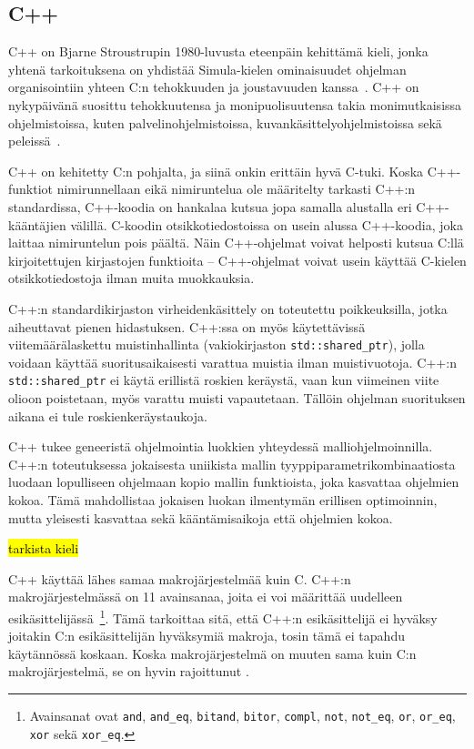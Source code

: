 \subsection{C++}

C++ on Bjarne Stroustrupin 1980-luvusta eteenpäin kehittämä kieli, jonka
yhtenä tarkoituksena on yhdistää Simula-kielen ominaisuudet ohjelman
organisointiin yhteen C:n tehokkuuden ja joustavuuden
kanssa~\citep{cpphistory}. C++ on nykypäivänä suosittu tehokkuutensa ja
monipuolisuutensa takia monimutkaisissa ohjelmistoissa, kuten
palvelinohjelmistoissa, kuvankäsittelyohjelmistoissa sekä
peleissä~\citep{cppapps}.

C++ on kehitetty C:n pohjalta, ja siinä onkin erittäin hyvä C-tuki. Koska
C++\hyp{}funktiot nimirunnellaan eikä nimiruntelua ole määritelty tarkasti C++:n
standardissa, C++-koodia on hankalaa kutsua jopa samalla alustalla eri
C++-kääntäjien välillä. C-koodin otsikkotiedostoissa on
usein alussa C++-koodia, joka laittaa nimiruntelun pois päältä. Näin
C++-ohjelmat voivat helposti kutsua C:llä kirjoitettujen kirjastojen funktioita
-- C++-ohjelmat voivat usein käyttää C-kielen otsikkotiedostoja ilman muita
muokkauksia.

C++:n standardikirjaston virheidenkäsittely on toteutettu poikkeuksilla, jotka
aiheuttavat pienen hidastuksen. C++:ssa on myös käytettävissä
viitemäärälaskettu muistinhallinta (vakiokirjaston
\texttt{std::shared\_ptr}), jolla voidaan käyttää suoritusaikaisesti varattua
muistia ilman muistivuotoja. C++:n \texttt{std::shared\_ptr} ei käytä erillistä
roskien keräystä, vaan kun viimeinen viite olioon poistetaan, myös varattu
muisti vapautetaan. Tällöin ohjelman suorituksen aikana ei tule
roskienkeräystaukoja.

C++ tukee geneeristä ohjelmointia luokkien
yhteydessä malliohjelmoinnilla. C++:n
toteutuksessa jokaisesta uniikista mallin tyyppiparametrikombinaatiosta luodaan
lopulliseen ohjelmaan kopio mallin funktioista, joka kasvattaa ohjelmien kokoa.
Tämä mahdollistaa jokaisen luokan ilmentymän erillisen
optimoinnin, mutta yleisesti kasvattaa sekä kääntämisaikoja että ohjelmien
kokoa.

\hl{tarkista kieli}

C++ käyttää lähes samaa makrojärjestelmää kuin C. C++:n makrojärjestelmässä on
11 avainsanaa, joita ei voi määrittää uudelleen
esikäsittelijässä~\citep[luku~19.2]{CPP17}\footnote{ Avainsanat ovat
\texttt{and}, \texttt{and\_eq}, \texttt{bitand}, \texttt{bitor},
\texttt{compl}, \texttt{not}, \texttt{not\_eq}, \texttt{or}, \texttt{or\_eq},
\texttt{xor} sekä \texttt{xor\_eq}. }. Tämä tarkoittaa sitä, että C++:n
esikäsittelijä ei hyväksy joitakin C:n esikäsittelijän hyväksymiä makroja,
tosin tämä ei tapahdu käytännössä koskaan. Koska makrojärjestelmä on muuten
sama kuin C:n makrojärjestelmä, se on hyvin rajoittunut \citep[luku~19]{CPP17}.

